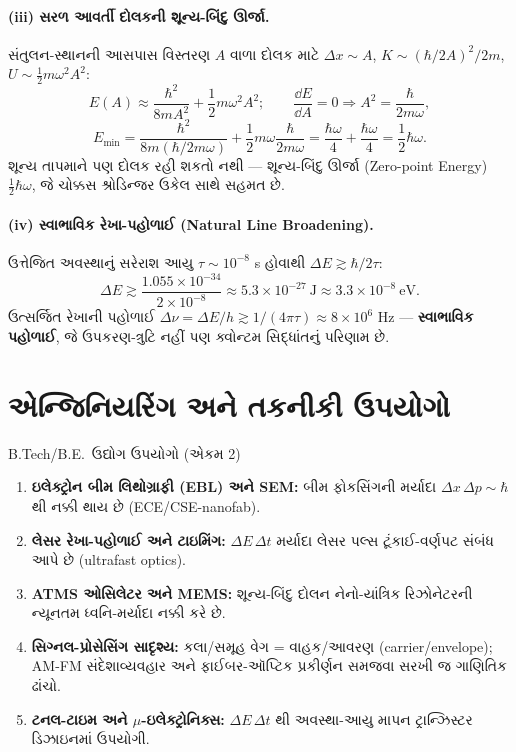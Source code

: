 \paragraph{(iii) સરળ આવર્તી દોલકની શૂન્ય-બિંદુ ઊર્જા.}
સંતુલન-સ્થાનની આસપાસ વિસ્તરણ $A$ વાળા દોલક માટે $\Delta x\sim A$, $K\sim(\hbar/2A)^2/2m$, $U\sim\tfrac12m\omega^2A^2$:
\[
E(A)\approx\frac{\hbar^{2}}{8mA^{2}}+\frac12m\omega^{2}A^{2};
\qquad
\frac{\dd E}{\dd A}=0\Rightarrow A^{2}=\frac{\hbar}{2m\omega},
\]
\[
E_{\min}=\frac{\hbar^{2}}{8m(\hbar/2m\omega)}+\frac12m\omega\frac{\hbar}{2m\omega}
=\frac{\hbar\omega}{4}+\frac{\hbar\omega}{4}=\frac12\hbar\omega .
\]
શૂન્ય તાપમાને પણ દોલક રહી શકતો નથી — શૂન્ય-બિંદુ ઊર્જા (Zero-point Energy) $\tfrac12\hbar\omega$, જે ચોક્કસ શ્રોડિન્જર ઉકેલ સાથે સહમત છે.

\paragraph{(iv) સ્વાભાવિક રેખા-પહોળાઈ (Natural Line Broadening).}
ઉત્તેજિત અવસ્થાનું સરેરાશ આયુ $\tau\sim10^{-8}$ s હોવાથી $\Delta E\gtrsim\hbar/2\tau$:
\[
\Delta E\gtrsim\frac{1.055\times10^{-34}}{2\times10^{-8}}\approx5.3\times10^{-27}\ \mathrm{J}\approx3.3\times10^{-8}\ \mathrm{eV}.
\]
ઉત્સર્જિત રેખાની પહોળાઈ $\Delta\nu=\Delta E/h\gtrsim1/(4\pi\tau)\approx8\times10^{6}$ Hz — \textbf{સ્વાભાવિક પહોળાઈ}, જે ઉપકરણ-ત્રુટિ નહીં પણ ક્વોન્ટમ સિદ્ધાંતનું પરિણામ છે.

\section{એન્જિનિયરિંગ અને તકનીકી ઉપયોગો}
\begin{upayogbox}{B.Tech/B.E.\ ઉદ્યોગ ઉપયોગો (એકમ 2)}
\begin{enumerate}[label=\textbullet]
  \item \textbf{ઇલેક્ટ્રોન બીમ લિથોગ્રાફી (EBL) અને SEM:} બીમ ફોકસિંગની મર્યાદા $\Delta x\,\Delta p\sim\hbar$ થી નક્કી થાય છે (ECE/CSE-nanofab).
  \item \textbf{લેસર રેખા-પહોળાઈ અને ટાઇમિંગ:} $\Delta E\,\Delta t$ મર્યાદા લેસર પલ્સ ટૂંકાઈ-વર્ણપટ સંબંધ આપે છે (ultrafast optics).
  \item \textbf{ATMS ઓસિલેટર અને MEMS:} શૂન્ય-બિંદુ દોલન નેનો-યાંત્રિક રિઝોનેટરની ન્યૂનતમ ધ્વનિ-મર્યાદા નક્કી કરે છે.
  \item \textbf{સિગ્નલ-પ્રોસેસિંગ સાદૃશ્ય:} કલા/સમૂહ વેગ = વાહક/આવરણ (carrier/envelope); AM-FM સંદેશાવ્યવહાર અને ફાઈબર-ઑપ્ટિક પ્રકીર્ણન સમજવા સરખી જ ગાણિતિક ઢાંચો.
  \item \textbf{ટનલ-ટાઇમ અને $\mu$-ઇલેક્ટ્રોનિક્સ:} $\Delta E\,\Delta t$ થી અવસ્થા-આયુ માપન ટ્રાન્ઝિસ્ટર ડિઝાઇનમાં ઉપયોગી.
\end{enumerate}
\end{upayogbox}

